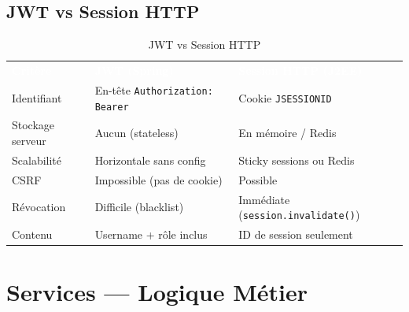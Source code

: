 \documentclass[11pt,a4paper]{article}
\newcommand{\code}[1]{\texttt{\small #1}}
\newcommand{\theadrowT}[3]{%
  \rowcolor{headerbg}\textcolor{white}{\textbf{#1}} & \textcolor{white}{\textbf{#2}} & \textcolor{white}{\textbf{#3}}\\}
\begin{document}
\subsection{JWT vs Session HTTP}

\begin{table}[h!]
\centering
\renewcommand{\arraystretch}{1.35}
\begin{tabularx}{\linewidth}{L{3.5cm} X X}
\theadrowT{Critère}{JWT (Spring)}{Session HTTP (J2EE)}
Identifiant        & En-tête \code{Authorization: Bearer} & Cookie \code{JSESSIONID} \\
Stockage serveur   & Aucun (stateless)             & En mémoire / Redis \\
Scalabilité        & Horizontale sans config       & Sticky sessions ou Redis \\
CSRF               & Impossible (pas de cookie)    & Possible \\
Révocation         & Difficile (blacklist)         & Immédiate (\code{session.invalidate()}) \\
Contenu            & Username + rôle inclus        & ID de session seulement \\
\bottomrule
\end{tabularx}
\caption{JWT vs Session HTTP}
\end{table}

\section{Services — Logique Métier}
\end{document}
